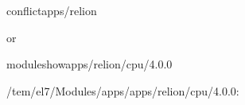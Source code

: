 \documentclass[a4paper,11pt,english]{sphinxmanual}
\begin{document}
\begin{sphinxVerbatim}[commandchars=\\\{\}]
conflictapps/relion
\PYGZhy{}\PYGZhy{}\PYGZhy{}\PYGZhy{}\PYGZhy{}\PYGZhy{}\PYGZhy{}\PYGZhy{}\PYGZhy{}\PYGZhy{}\PYGZhy{}\PYGZhy{}\PYGZhy{}\PYGZhy{}\PYGZhy{}\PYGZhy{}\PYGZhy{}\PYGZhy{}\PYGZhy{}\PYGZhy{}\PYGZhy{}\PYGZhy{}\PYGZhy{}\PYGZhy{}\PYGZhy{}\PYGZhy{}\PYGZhy{}\PYGZhy{}\PYGZhy{}\PYGZhy{}\PYGZhy{}\PYGZhy{}\PYGZhy{}\PYGZhy{}\PYGZhy{}\PYGZhy{}\PYGZhy{}\PYGZhy{}\PYGZhy{}\PYGZhy{}\PYGZhy{}\PYGZhy{}\PYGZhy{}\PYGZhy{}\PYGZhy{}\PYGZhy{}\PYGZhy{}\PYGZhy{}\PYGZhy{}\PYGZhy{}\PYGZhy{}\PYGZhy{}\PYGZhy{}\PYGZhy{}\PYGZhy{}\PYGZhy{}\PYGZhy{}\PYGZhy{}\PYGZhy{}\PYGZhy{}\PYGZhy{}\PYGZhy{}\PYGZhy{}\PYGZhy{}\PYGZhy{}\PYGZhy{}\PYGZhy{}

or

\PYGZdl{}\PYGZgt{}moduleshowapps/relion/cpu/4.0.0

\PYGZhy{}\PYGZhy{}\PYGZhy{}\PYGZhy{}\PYGZhy{}\PYGZhy{}\PYGZhy{}\PYGZhy{}\PYGZhy{}\PYGZhy{}\PYGZhy{}\PYGZhy{}\PYGZhy{}\PYGZhy{}\PYGZhy{}\PYGZhy{}\PYGZhy{}\PYGZhy{}\PYGZhy{}\PYGZhy{}\PYGZhy{}\PYGZhy{}\PYGZhy{}\PYGZhy{}\PYGZhy{}\PYGZhy{}\PYGZhy{}\PYGZhy{}\PYGZhy{}\PYGZhy{}\PYGZhy{}\PYGZhy{}\PYGZhy{}\PYGZhy{}\PYGZhy{}\PYGZhy{}\PYGZhy{}\PYGZhy{}\PYGZhy{}\PYGZhy{}\PYGZhy{}\PYGZhy{}\PYGZhy{}\PYGZhy{}\PYGZhy{}\PYGZhy{}\PYGZhy{}\PYGZhy{}\PYGZhy{}\PYGZhy{}\PYGZhy{}\PYGZhy{}\PYGZhy{}\PYGZhy{}\PYGZhy{}\PYGZhy{}\PYGZhy{}\PYGZhy{}\PYGZhy{}\PYGZhy{}\PYGZhy{}\PYGZhy{}\PYGZhy{}\PYGZhy{}\PYGZhy{}\PYGZhy{}\PYGZhy{}
/tem/el7/Modules/apps/apps/relion/cpu/4.0.0:


\end{sphinxVerbatim}
\end{document}
